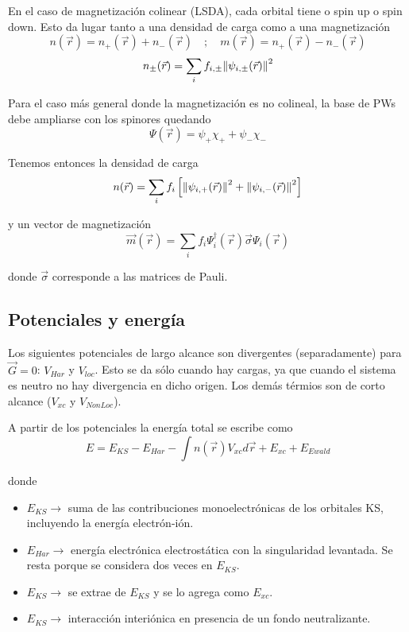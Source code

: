   En el caso de magnetización colinear (LSDA), cada orbital tiene o spin up o spin down. Esto da lugar tanto a una densidad de carga como a una magnetización
    $$n (\vec{r}) = n_{+} (\vec{r}) + n_{-} (\vec{r}) \quad ; \quad m (\vec{r}) = n_{+} (\vec{r}) - n_{-} (\vec{r})$$
    $$n_{\pm} (\vec{r}) = \sum_i f_{i, \pm} \norm{\psi_{i, \pm} (\vec{r})}^2$$


  Para el caso más general donde la magnetización es no colineal, la base de PWs debe ampliarse con los spinores quedando
    $$\Psi (\vec{r}) = \psi_+ \chi_+ + \psi_- \chi_-$$

  Tenemos entonces la densidad de carga
    $$n (\vec{r}) = \sum_i f_i \left[ \norm{\psi_{i,+} (\vec{r})}^2 + \norm{\psi_{i,-} (\vec{r})}^2 \right]$$

  y un vector de magnetización
    $$\vec{m} (\vec{r}) = \sum_i f_i \Psi_i^{\dagger} (\vec{r}) \vec{\sigma} \Psi_i (\vec{r})$$

  donde $\vec{\sigma}$ corresponde a las matrices de Pauli.

\subsection{Potenciales y energía}

  Los siguientes potenciales de largo alcance son divergentes (separadamente) para $\vec{G} = 0$: $V_{Har}$ y $V_{loc}$. Esto se da sólo cuando hay cargas, ya que cuando el sistema es neutro no hay divergencia en dicho origen. Los demás térmios son de corto alcance ($V_{xc}$ y $V_{NonLoc}$).

  A partir de los potenciales la energía total se escribe como
    $$E = E_{KS} - E_{Har} - \int n(\vec{r}) V_{xc} d\vec{r} + E_{xc} + E_{Ewald}$$

  donde
    \begin{itemize}
      \item $E_{KS} \rightarrow$ suma de las contribuciones monoelectrónicas de los orbitales KS, incluyendo la energía electrón-ión.
      \item $E_{Har} \rightarrow$ energía electrónica electrostática con la singularidad levantada. Se resta porque se considera dos veces en $E_{KS}$.
      \item $E_{KS} \rightarrow$ se extrae de $E_{KS}$ y se lo agrega como $E_{xc}$.
      \item $E_{KS} \rightarrow$ interacción interiónica en presencia de un fondo neutralizante.
    \end{itemize}

